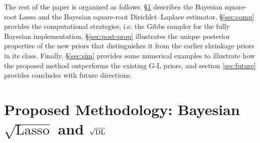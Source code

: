 \documentclass[10pt]{article}
\begin{document}
The rest of the paper is organized as follows: \S \ref{ch:2} describes the Bayesian square-root Lasso and the Bayesian square-root Dirichlet--Laplace estimator, \S \ref{sec:comp} provides the computational strategies, i.e. the Gibbs sampler for the fully Bayesian implementation, \S \ref{sec:post-prop} illustrates the unique posterior properties of the new priors that distinguishes it from the earlier shrinkage priors in its class. Finally, \S \ref{sec:sim} provides some numerical examples to illustrate how the proposed method outperforms the existing G-L priors, and section \ref{sec:future} provides concludes with future directions.  



\section{Proposed Methodology: Bayesian \texorpdfstring{$\sqrt{\text{Lasso}}$}{Square-root Lasso} and \texorpdfstring{$\sqrt{\text{\rm{DL}}}$}{Square-root DL}}\label{ch:2}
\end{document}
